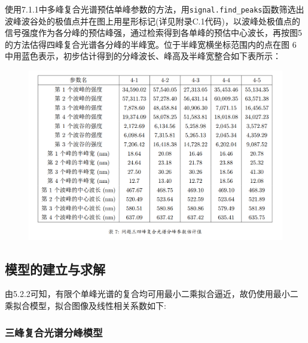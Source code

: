 \documentclass{article}
\numberwithin{equation}{subsection}
\begin{document}
使用7.1.1中多峰复合光谱预估单峰参数的方法，用\verb|signal.find_peaks|函数筛选出波峰波谷处的极值点并在图上用星形标记(详见附录C.1代码)，以波峰处极值点的信号强度作为各分峰的预估峰强，通过检索得到各单峰的预估中心波长，再按图5的方法估得四峰复合光谱各分峰的半峰宽。位于半峰宽横坐标范围内的点在图 6 中用蓝色表示，初步估计得到的分峰波长、峰高及半峰宽整合如下表所示：
\begin{figure}[H]
    \centering
    \includegraphics[scale=0.38]{四峰拆分预估参数.png}
    
\end{figure}

\newpage
\subsection{模型的建立与求解}
由5.2.2可知，有限个单峰光谱的复合均可用最小二乘拟合逼近，故仍使用最小二乘拟合模型，拟合图像及线性相关系数如下:
\subsubsection{三峰复合光谱分峰模型}
\end{document}
